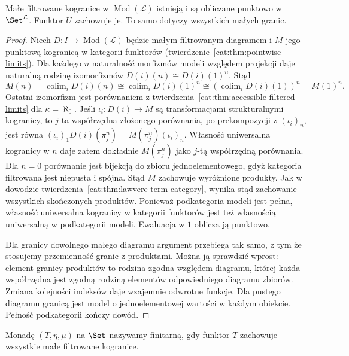 \begin{stwierdzenie}\label{cat:prop:lawvere-filtered}
Małe filtrowane kogranice w $\operatorname{Mod}(\mathcal L)$ istnieją i są obliczane punktowo w $\Set^{\mathcal L}$. Funktor $U$ zachowuje je. To samo dotyczy wszystkich małych granic.
\end{stwierdzenie}
\begin{proof}
Niech $D:I\to\operatorname{Mod}(\mathcal L)$ będzie małym filtrowanym diagramem i $M$ jego punktową kogranicą w kategorii funktorów (twierdzenie~\ref{cat:thm:pointwise-limits}). Dla każdego $n$ naturalność morfizmów modeli względem projekcji daje naturalną rodzinę izomorfizmów $D(i)(n)\cong D(i)(1)^n$. Stąd
\[
 M(n)=\operatorname{colim}_iD(i)(n)
 \cong\operatorname{colim}_iD(i)(1)^n
 \cong\left(\operatorname{colim}_iD(i)(1)\right)^n=M(1)^n.
\]
Ostatni izomorfizm jest porównaniem z twierdzenia~\ref{cat:thm:accessible-filtered-limits} dla $\kappa=\aleph_0$. Jeśli $\iota_i:D(i)\to M$ są transformacjami strukturalnymi kogranicy, to $j$-ta współrzędna złożonego porównania, po prekompozycji z $(\iota_i)_n$, jest równa $(\iota_i)_1D(i)(\pi_j^n)=M(\pi_j^n)(\iota_i)_n$. Własność uniwersalna kogranicy w $n$ daje zatem dokładnie $M(\pi_j^n)$ jako $j$-tą współrzędną porównania. Dla $n=0$ porównanie jest bijekcją do zbioru jednoelementowego, gdyż kategoria filtrowana jest niepusta i spójna. Stąd $M$ zachowuje wyróżnione produkty. Jak w dowodzie twierdzenia~\ref{cat:thm:lawvere-term-category}, wynika stąd zachowanie wszystkich skończonych produktów. Ponieważ podkategoria modeli jest pełna, własność uniwersalna kogranicy w kategorii funktorów jest też własnością uniwersalną w podkategorii modeli. Ewaluacja w $1$ oblicza ją punktowo.

Dla granicy dowolnego małego diagramu argument przebiega tak samo, z tym że stosujemy przemienność granic z produktami. Można ją sprawdzić wprost: element granicy produktów to rodzina zgodna względem diagramu, której każda współrzędna jest zgodną rodziną elementów odpowiedniego diagramu zbiorów. Zmiana kolejności indeksów daje wzajemnie odwrotne funkcje. Dla pustego diagramu granicą jest model o jednoelementowej wartości w każdym obiekcie. Pełność podkategorii kończy dowód.
\end{proof}

\begin{definicja}\label{cat:def:lawvere-finitary}
Monadę $(T,\eta,\mu)$ na $\Set$ nazywamy finitarną, gdy funktor $T$ zachowuje wszystkie małe filtrowane kogranice.
\end{definicja}

